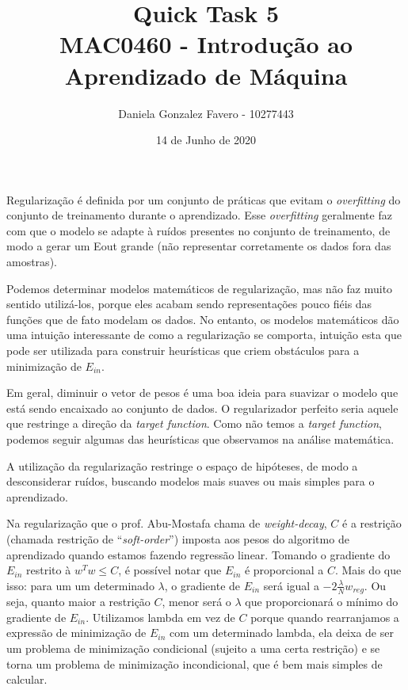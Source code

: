 \documentclass[a4paper,11pt]{article}
\title{%
    Quick Task 5\\
    \large MAC0460 - Introdução ao Aprendizado de Máquina
}
\author{Daniela Gonzalez Favero - 10277443}
\date{14 de Junho de 2020}
\begin{document}
    \maketitle

    Regularização é definida por um conjunto de práticas que evitam o \textit{overfitting} do conjunto de treinamento durante o aprendizado. Esse \textit{overfitting} geralmente faz com que o modelo se adapte à ruídos presentes no conjunto de treinamento, de modo a gerar um Eout grande (não representar corretamente os dados fora das amostras).
    
    Podemos determinar modelos matemáticos de regularização, mas não faz muito sentido utilizá-los, porque eles acabam sendo representações pouco fiéis das funções que de fato modelam os dados. No entanto, os modelos matemáticos dão uma intuição interessante de como a regularização se comporta, intuição esta que pode ser utilizada para construir heurísticas que criem obstáculos para a minimização de $E_{in}$.
    
    Em geral, diminuir o vetor de pesos é uma boa ideia para suavizar o modelo que está sendo encaixado ao conjunto de dados. O regularizador perfeito seria aquele que restringe a direção da \textit{target function}. Como não temos a \textit{target function}, podemos seguir algumas das heurísticas que observamos na análise matemática.
    
    A utilização da regularização restringe o espaço de hipóteses, de modo a desconsiderar ruídos, buscando modelos mais suaves ou mais simples para o aprendizado.
    
    Na regularização que o prof. Abu-Mostafa chama de \textit{weight-decay}, $C$ é a restrição (chamada restrição de ``\textit{soft-order}'') imposta aos pesos do algoritmo de aprendizado quando estamos fazendo regressão linear. Tomando o gradiente do $E_{in}$ restrito à $w^Tw \leq C$, é possível notar que $E_{in}$ é proporcional a $C$. Mais do que isso: para um um determinado $\lambda$, o gradiente de $E_{in}$ será igual a $-2 \frac{\lambda}{N} w_{reg}$. Ou seja, quanto maior a restrição $C$, menor será o $\lambda$ que proporcionará o mínimo do gradiente de $E_{in}$. Utilizamos lambda em vez de $C$ porque quando rearranjamos a expressão de minimização de $E_{in}$ com um determinado lambda, ela deixa de ser um problema de minimização condicional (sujeito a uma certa restrição) e se torna um problema de minimização incondicional, que é bem mais simples de calcular.
\end{document}

